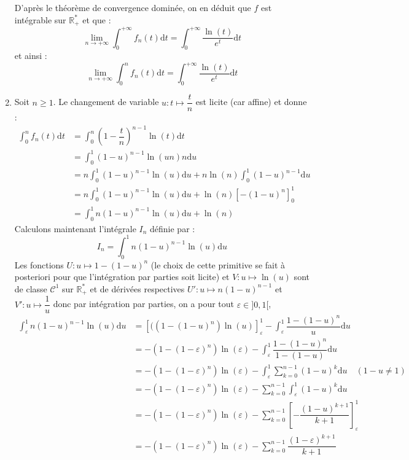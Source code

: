 \documentclass[a4paper,twoside,french,10pt]{VcCours}
\newcommand{\dt}{\text{d}t}
\begin{document}
\begin{enumerate}
\begin{itemize}
\end{itemize}
D'après le théorème de convergence dominée, on en déduit que $f$ est intégrable sur $\mathbb{R}_+^{*}$ et que :
$$ \lim_{n \rightarrow + \infty} \int_{0}^{+ \infty} f_n(t) \dt = \int_{0}^{+ \infty} \dfrac{\ln(t)}{e^t} \dt$$
et ainsi :
$$\lim_{n \rightarrow + \infty} \int_{0}^n f_n(t) \dt = \int_{0}^{+ \infty} \dfrac{\ln(t)}{e^t} \dt$$
\item Soit $n \geq 1$. Le changement de variable $u : t \mapsto \dfrac{t}{n}$ est licite (car affine) et donne :
\begin{align*}
\int_{0}^n f_n(t) \dt & = \int_{0}^n \left(1 - \dfrac{t}{n}\right)^{n-1} \ln(t) \dt \\
& = \int_{0}^1  (1-u)^{n-1} \ln(un) n \textrm{d}u \\
& = n \int_{0}^1  (1-u)^{n-1} \ln(u) \textrm{d}u  +  n\ln(n) \int_{0}^1  (1-u)^{n-1} \textrm{d}u \\
& = n \int_{0}^1  (1-u)^{n-1} \ln(u) \textrm{d}u +  \ln(n) [-(1-u)^n ]_0^1 \\
& =  \int_{0}^1 n (1-u)^{n-1} \ln(u) \textrm{d}u +  \ln(n) 
\end{align*}
Calculons maintenant l'intégrale $I_n$ définie par :
$$ I_n = \int_{0}^1  n(1-u)^{n-1} \ln(u) \textrm{d}u$$
Les fonctions $U : u \mapsto 1-(1-u)^n$ (le choix de cette primitive se fait à posteriori pour que l'intégration par parties soit licite) et $V : u \mapsto \ln(u)$ sont de classe $\mathcal{C}^1$ sur $\mathbb{R}_+^{*}$ et de dérivées respectives $U' : u \mapsto n(1-u)^{n-1}$ et $V' : u \mapsto \dfrac{1}{u}$ donc par intégration par parties, on a pour tout $\varepsilon \in ]0,1[$,
\begin{align*}
 \int_{\varepsilon}^1 n (1-u)^{n-1} \ln(u) \textrm{d}u & = [((1-(1-u)^n)\ln(u)]_{\varepsilon}^1 - \int_{\varepsilon}^1 \dfrac{1-(1-u)^n}{u} \textrm{d}u \\
 & = -(1-(1- \varepsilon)^n)\ln(\varepsilon) - \int_{\varepsilon}^1 \dfrac{1-(1-u)^n}{1-(1-u)} \textrm{d}u \\ 
 & = -(1-(1- \varepsilon)^n)\ln(\varepsilon)  - \int_{\varepsilon}^1  \sum_{k=0}^{n-1} (1-u)^k \textrm{d}u  \quad (1-u \neq 1) \\ 
 & = -(1-(1- \varepsilon)^n)\ln(\varepsilon)  - \sum_{k=0}^{n-1} \int_{\varepsilon}^1   (1-u)^k \textrm{d}u \\ 
 & = -(1-(1- \varepsilon)^n)\ln(\varepsilon)  - \sum_{k=0}^{n-1} \left[ -\dfrac{(1-u)^{k+1}}{k+1}\right]_{\varepsilon}^1 \\
 & = -(1-(1- \varepsilon)^n)\ln(\varepsilon)  - \sum_{k=0}^{n-1} \dfrac{(1-\varepsilon)^{k+1}}{k+1} 

\end{align*}
\end{enumerate}
\end{document}
